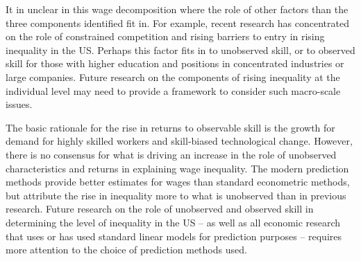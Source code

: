 \documentclass[notitlepage,12pt]{article}
\begin{document}
It in unclear in this wage decomposition where the role of other factors than the three components identified fit in.  For example, recent research has concentrated on the role of constrained competition and rising barriers to entry in rising inequality in the US.  Perhaps this factor fits in to unobserved skill, or to observed skill for those with higher education and positions in concentrated industries or large companies.  Future research on the components of rising inequality at the individual level may need to provide a framework to consider such macro-scale issues.

The basic rationale for the rise in returns to observable skill is the growth for demand for highly skilled workers and skill-biased technological change.  However, there is no consensus for what is driving an increase in the role of unobserved characteristics and returns in explaining wage inequality. The modern prediction methods provide better estimates for wages than standard econometric methods, but attribute the rise in inequality more to what is unobserved than in previous research.  Future research on the role of unobserved and observed skill in determining the level of inequality in the US -- as well as all economic research that uses or has used standard linear models for prediction purposes -- requires more attention to the choice of prediction methods used.



\end{document}

